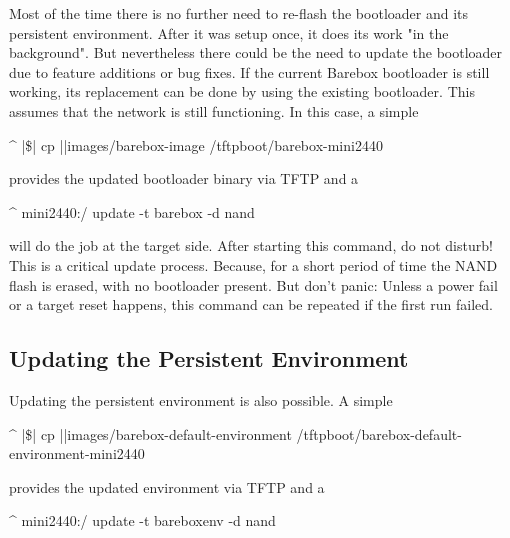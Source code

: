 Most of the time there is no further need to re-flash the bootloader and its
persistent environment. After it was setup once, it does its work "in the
background". But nevertheless there could be the need to update the bootloader
due to feature additions or bug fixes. If the current Barebox bootloader is
still working, its replacement can be done by using the existing bootloader.
This assumes that the network is still functioning. In this case, a simple

\begin{ptxshell}[escapechar=|]{^}
|\$| cp |\ptxdistPlatformDir |images/barebox-image /tftpboot/barebox-mini2440
\end{ptxshell}

provides the updated bootloader binary via TFTP and a

\begin{ptxshell}[escapechar=|]{^}
mini2440:/ update -t barebox -d nand
\end{ptxshell}

will do the job at the target side. After starting this command, do not disturb!
This is a critical update process. Because, for a short period of time the
NAND flash is erased, with no bootloader present. But don't panic: Unless a
power fail or a target reset happens, this command can be repeated if the
first run failed.

\subsection{Updating the Persistent Environment}


Updating the persistent environment is also possible. A simple

\begin{ptxshell}[escapechar=|]{^}
|\$| cp |\ptxdistPlatformDir |images/barebox-default-environment /tftpboot/barebox-default-environment-mini2440
\end{ptxshell}

provides the updated environment via TFTP and a

\begin{ptxshell}[escapechar=|]{^}
mini2440:/ update -t bareboxenv -d nand
\end{ptxshell}

